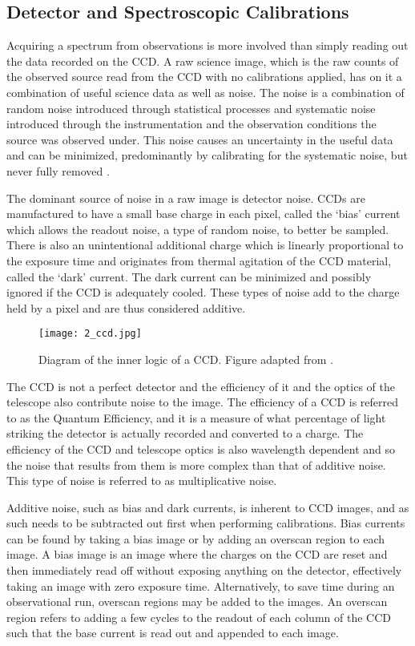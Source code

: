 \subsection{Detector and Spectroscopic Calibrations} \label{subsec:calibration}

Acquiring a spectrum from observations is more involved than simply reading out the data recorded on the \gls{CCD}. A raw science image, which is the raw counts of the observed source read from the \gls{CCD} with no calibrations applied, has on it a combination of useful science data as well as noise. The noise is a combination of random noise introduced through statistical processes and systematic noise introduced through the instrumentation and the observation conditions the source was observed under. This noise causes an uncertainty in the useful data and can be minimized, predominantly by calibrating for the systematic noise, but never fully removed \citep{CCDhandbook}.

The dominant source of noise in a raw image is detector noise. \glspl{CCD} are manufactured to have a small base charge in each pixel, called the `bias' current which allows the readout noise, a type of random noise, to better be sampled. There is also an unintentional additional charge which is linearly proportional to the exposure time and originates from thermal agitation of the \gls{CCD} material, called the `dark' current. The dark current can be minimized and possibly ignored if the \gls{CCD} is adequately cooled. These types of noise add to the charge held by a pixel and are thus considered additive.

\begin{figure}[t]
    \centering
    \texttt{[image: 2\_ccd.jpg]}
    \caption{Diagram of the inner logic of a \gls{CCD}. Figure adapted from \cite{ccd_fig}.}
    \label{fig:ccd_diagram}
\end{figure}

The \gls{CCD} is not a perfect detector and the efficiency of it and the optics of the telescope also contribute noise to the image. The efficiency of a \gls{CCD} is referred to as the Quantum Efficiency, and it is a measure of what percentage of light striking the detector is actually recorded and converted to a charge. The efficiency of the \gls{CCD} and telescope optics is also wavelength dependent and so the noise that results from them is more complex than that of additive noise. This type of noise is referred to as multiplicative noise.

Additive noise, such as bias and dark currents, is inherent to \gls{CCD} images, and as such needs to be subtracted out first when performing calibrations. Bias currents can be found by taking a bias image or by adding an overscan region to each image. A bias image is an image where the charges on the \gls{CCD} are reset and then immediately read off without exposing anything on the detector, effectively taking an image with zero exposure time. Alternatively, to save time during an observational run, overscan regions may be added to the images. An overscan region refers to adding a few cycles to the readout of each column of the \gls{CCD} such that the base current is read out and appended to each image.

